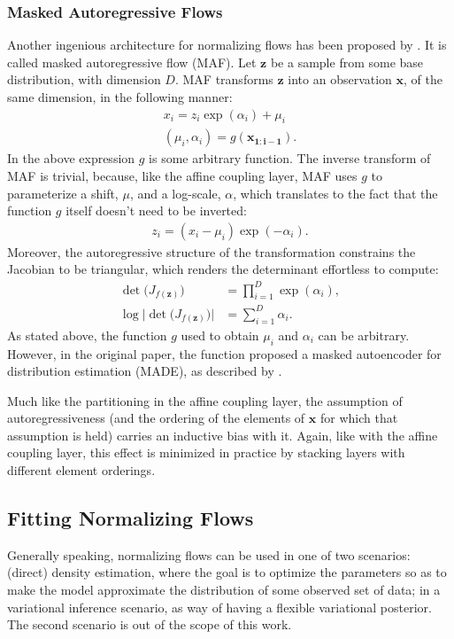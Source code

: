 \subsubsection{Masked Autoregressive Flows}
Another ingenious architecture for normalizing flows has been proposed by \textcite{maf}.
It is called masked autoregressive flow (MAF). Let $\bm{z}$ be a sample from
some base distribution, with dimension $D$. MAF transforms $\bm{z}$ into an
observation $\bm{x}$, of the same dimension, in the following manner:
\begin{align}
x_i = z_i \exp(\alpha_i) + \mu_i \\
(\mu_i, \alpha_i) = g(\bm{x_{1:i-1}}).
\end{align}
In the above expression $g$ is some arbitrary function. The inverse transform of
MAF is trivial, because, like the affine coupling layer, MAF uses $g$ to parameterize
a shift, $\mu$, and a log-scale, $\alpha$, which translates to the fact that the
function $g$ itself doesn't need to be inverted:
\begin{align}
z_i = (x_i - \mu_i)\exp(-\alpha_i).
\end{align}
Moreover, the autoregressive structure of the transformation constrains the
Jacobian to be triangular, which renders the determinant effortless to compute: 
\begin{align}
\det\big( J_{f(\bm{z})} \big) &= \prod_{i=1}^{D} \exp(\alpha_i), \\
\log \Big| \det \big( J_{f(\bm{z})} \big) \Big| &= \sum_{i=1}^{D} \alpha_i.
\end{align}
As stated above, the function $g$ used to obtain $\mu_i$ and $\alpha_i$ can be
arbitrary. However, in the original paper, the function proposed a masked
autoencoder for distribution estimation (MADE), as described by \textcite{MADE}.

Much like the partitioning in the affine coupling layer, the assumption of
autoregressiveness (and the ordering of the elements of $\bm{x}$
for which that assumption is held) carries an inductive bias with it. Again,
like with the affine coupling layer, this effect is minimized in practice by
stacking layers with different element orderings.

\subsection{Fitting Normalizing Flows}

Generally speaking, normalizing flows can be used in one of two scenarios:
(direct) density estimation, where the goal is to optimize the parameters
so as to make the model approximate the distribution of some observed set of data;
in a variational inference scenario, as way of having a flexible variational
posterior. The second scenario is out of the scope of this work.

